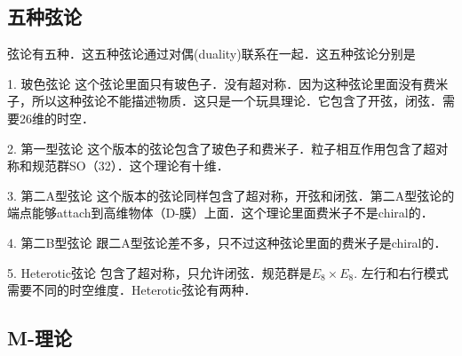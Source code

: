\subsection{五种弦论}

弦论有五种．这五种弦论通过对偶(duality)联系在一起．这五种弦论分别是

1. 玻色弦论
这个弦论里面只有玻色子．没有超对称．因为这种弦论里面没有费米子，所以这种弦论不能描述物质．这只是一个玩具理论．它包含了开弦，闭弦．需要26维的时空．

2. 第一型弦论
这个版本的弦论包含了玻色子和费米子．粒子相互作用包含了超对称和规范群SO（32）．这个理论有十维．

3. 第二A型弦论
这个版本的弦论同样包含了超对称，开弦和闭弦．第二A型弦论的端点能够attach到高维物体（D-膜）上面．这个理论里面费米子不是chiral的．

4. 第二B型弦论
跟二A型弦论差不多，只不过这种弦论里面的费米子是chiral的．

5. Heterotic弦论
包含了超对称，只允许闭弦．规范群是$E_8\times E_8$. 左行和右行模式需要不同的时空维度．Heterotic弦论有两种．

\subsection{M-理论}

